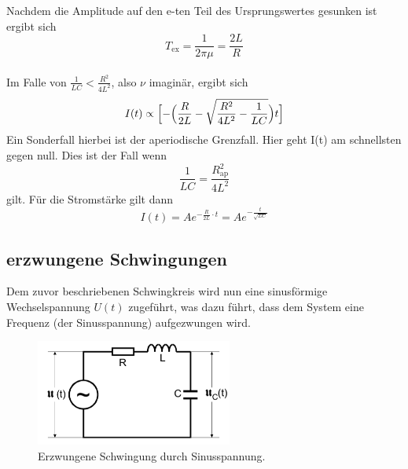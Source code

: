 Nachdem die Amplitude auf den e-ten Teil des Ursprungswertes gesunken ist ergibt sich
\begin{equation}
	T_\text{ex} = \frac{1}{2\pi \mu} = \frac{2L}{R}
\end{equation}
\\
Im Falle von $\frac{1}{LC} < \frac{R^2}{4L^2}$, also $\nu$ imaginär, ergibt sich 
\begin{equation}
	I(t) \propto \Bigl[-\Bigl(\frac{R}{2L}-\sqrt{\frac{R^2}{4L^2} - \frac{1}{LC}}\Bigr)t\Bigr]
\end{equation}
Ein Sonderfall hierbei ist der aperiodische Grenzfall. Hier geht I(t) am schnellsten gegen null.
Dies ist der Fall wenn 
\begin{equation}
	\frac{1}{LC} = \frac{R_\text{ap}^2}{4L^2}
\end{equation}
gilt. Für die Stromstärke gilt dann
\begin{equation}
	I(t) = Ae^{-\frac{R}{2L}\cdot t} = Ae^{-\frac{t}{\sqrt{LC}}}
\end{equation}

\subsection{erzwungene Schwingungen}

Dem zuvor beschriebenen Schwingkreis wird nun eine sinusförmige Wechselspannung $U(t)$ zugeführt, was dazu führt, dass dem System eine Frequenz (der Sinusspannung) aufgezwungen wird.
\begin{figure}[H]
  \centering
  \includegraphics[height=3.5cm]{Grafiken/Erzwungen.pdf}
  \caption{Erzwungene Schwingung durch Sinusspannung.\cite{1}}
  \label{fig:Erzwungen}
\end{figure}

